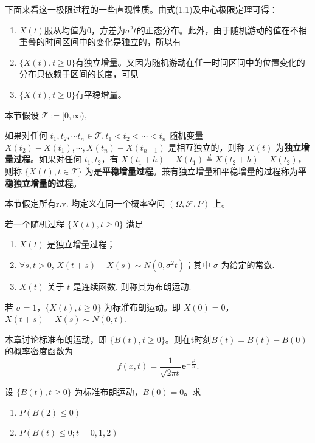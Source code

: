 \documentclass[lang=cn,10pt,thmcnt=section]{elegantbook}
\begin{document}
下面来看这一极限过程的一些直观性质。由式(1.1)及中心极限定理可得：
\begin{enumerate}
    \item $X(t)$服从均值为0，方差为$\sigma^2 t$的正态分布。此外，由于随机游动的值在不相重叠的时间区间中的变化是独立的，所以有
    \item $\{X(t), t \geq 0\}$有独立增量。又因为随机游动在任一时间区间中的位置变化的分布只依赖于区间的长度，可见
    \item $\{X(t), t \geq 0\}$有平稳增量。
\end{enumerate}

本节假设 $\mathcal{T} := [0, \infty)$,
\begin{definition}
	如果对任何 $t_1, t_2, \cdots t_n \in \mathcal{T}, t_1 < t_2 < \cdots < t_n$ 随机变量 $X(t_2) - X(t_1), \cdots, X(t_n) - X(t_{n-1})$ 是相互独立的，则称 $X(t)$ 为\textbf{独立增量过程}。如果对任何 $t_1, t_2$，有 $X(t_1 + h) - X(t_1) \overset{d}{=} X(t_2 + h) - X(t_2)$，则称 $\{X(t), t \in \mathcal{T}\}$ 为是\textbf{平稳增量过程}。兼有独立增量和平稳增量的过程称为\textbf{平稳独立增量的过程}。
\end{definition}

本节假定所有r.v. 均定义在同一个概率空间 $(\Omega, \mathcal{F}, P)$ 上。
\begin{definition}
	若一个随机过程 $\{X(t), t \geq 0\}$ 满足
\begin{enumerate}
    \item $X(t)$ 是独立增量过程；
    \item $\forall s, t > 0$, $X(t+s) - X(s) \sim N(0, \sigma^2 t)$；其中 $\sigma$ 为给定的常数.
    \item $X(t)$ 关于 $t$ 是连续函数. 则称其为布朗运动.
\end{enumerate}
\end{definition}
\begin{remark}
	若 $\sigma = 1$，$\{X(t), t \geq 0\}$ 为标准布朗运动。即 $X(0) = 0$，$X(t+s) - X(s) \sim N(0, t)$.
\end{remark}
本章讨论标准布朗运动，即 $\{B(t), t \geq 0\}$。则在t时刻$B(t) = B(t) - B(0)$的概率密度函数为
\[
f(x,t) = \frac{1}{\sqrt{2\pi t}} \mathbf{e}^{-\frac{x^2}{2t}}.
\]

\begin{example}
	设 $\{B(t), t \geq 0\}$ 为标准布朗运动，$B(0) = 0$。求
\begin{enumerate}
    \item $P(B(2) \leq 0)$
    \item $P(B(t) \leq 0; t = 0, 1, 2)$
\end{enumerate}

\end{example}
\end{document}

